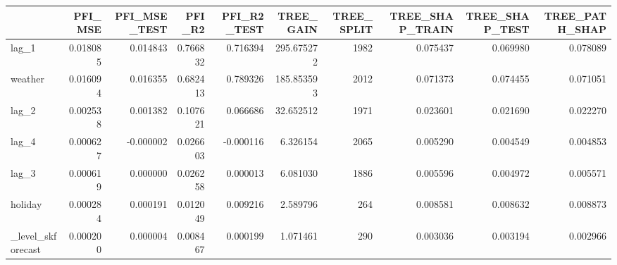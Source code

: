 \begin{tabular}{lrrrrrrrrr}
    \toprule
    & PFI\_MSE  & PFI\_MSE\_TEST & PFI\_R2   & PFI\_R2\_TEST & TREE\_GAIN  & TREE\_SPLIT & TREE\_SHAP\_TRAIN & TREE\_SHAP\_TEST & TREE\_PATH\_SHAP \\
    \midrule
    lag\_1             & 0.018085 & 0.014843     & 0.766832 & 0.716394    & 295.675272 & 1982       & 0.075437        & 0.069980       & 0.078089       \\
    weather           & 0.016094 & 0.016355     & 0.682413 & 0.789326    & 185.853593 & 2012       & 0.071373        & 0.074455       & 0.071051       \\
    lag\_2             & 0.002538 & 0.001382     & 0.107621 & 0.066686    & 32.652512  & 1971       & 0.023601        & 0.021690       & 0.022270       \\
    lag\_4             & 0.000627 & -0.000002    & 0.026603 & -0.000116   & 6.326154   & 2065       & 0.005290        & 0.004549       & 0.004853       \\
    lag\_3             & 0.000619 & 0.000000     & 0.026258 & 0.000013    & 6.081030   & 1886       & 0.005596        & 0.004972       & 0.005571       \\
    holiday           & 0.000284 & 0.000191     & 0.012049 & 0.009216    & 2.589796   & 264        & 0.008581        & 0.008632       & 0.008873       \\
    \_level\_skforecast & 0.000200 & 0.000004     & 0.008467 & 0.000199    & 1.071461   & 290        & 0.003036        & 0.003194 & 0.002966 \\
    \bottomrule
\end{tabular}
